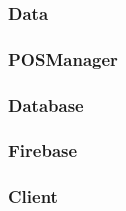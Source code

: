 \subsubsection{Data}


\subsubsection{POSManager}

\newpage

\subsubsection{Database}


\newpage
\subsubsection{Firebase}


\newpage
\subsubsection{Client}


